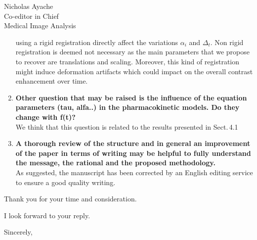 \documentclass{letter}
\begin{document}
\begin{letter}{Nicholas Ayache \\ Co-editor in Chief \\ Medical Image Analysis}
\begin{enumerate}
    using a rigid registration directly affect the variations
    $\alpha_i$ and $\Delta_t$. Non rigid registration is deemed not
    necessary as the main parameters that we propose to recover are
    translations and scaling. Moreover, this kind of registration
    might induce deformation artifacts which could impact on the
    overall contrast enhancement over time.
  \item \textbf{Other question that may be raised is the influence of
      the equation parameters (tau, alfa..) in the pharmacokinetic
      models. Do they change with f(t)?}\\
    We think that this question is related to the results presented in
    Sect.\,4.1
  \item \textbf{A thorough review of the structure and in general an
      improvement of the paper in terms of writing may be helpful to
      fully understand the message, the rational and the proposed
      methodology.}\\
    As suggested, the manuscript has been corrected by an English editing
    service to ensure a good quality writing.
  \end{enumerate}

  Thank you for your time and consideration.

  I look forward to your reply.

  \vspace{2\parskip} %
  \closing{Sincerely,}
  \vspace{2\parskip} %


\end{letter}
\end{document}
